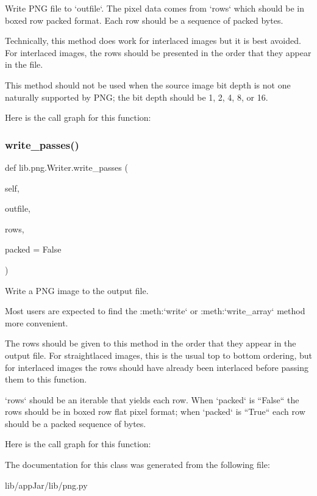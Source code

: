 \begin{DoxyVerb}Write PNG file to `outfile`.  The pixel data comes from `rows`
which should be in boxed row packed format.  Each row should be
a sequence of packed bytes.

Technically, this method does work for interlaced images but it
is best avoided.  For interlaced images, the rows should be
presented in the order that they appear in the file.

This method should not be used when the source image bit depth
is not one naturally supported by PNG; the bit depth should be
1, 2, 4, 8, or 16.
\end{DoxyVerb}
 Here is the call graph for this function\+:
\mbox{\label{classlib_1_1png_1_1_writer_a6826050647c055bb388782a46f5fc08f}} 
\subsubsection{\texorpdfstring{write\+\_\+passes()}{write\_passes()}}
{\footnotesize\ttfamily def lib.\+png.\+Writer.\+write\+\_\+passes (\begin{DoxyParamCaption}\item[{}]{self,  }\item[{}]{outfile,  }\item[{}]{rows,  }\item[{}]{packed = {\ttfamily False} }\end{DoxyParamCaption})}

\begin{DoxyVerb}Write a PNG image to the output file.

Most users are expected to find the :meth:`write` or
:meth:`write_array` method more convenient.

The rows should be given to this method in the order that
they appear in the output file.  For straightlaced images,
this is the usual top to bottom ordering, but for interlaced
images the rows should have already been interlaced before
passing them to this function.

`rows` should be an iterable that yields each row.  When
`packed` is ``False`` the rows should be in boxed row flat pixel
format; when `packed` is ``True`` each row should be a packed
sequence of bytes.
\end{DoxyVerb}
 Here is the call graph for this function\+:


The documentation for this class was generated from the following file\+:\begin{DoxyCompactItemize}
\item 
lib/app\+Jar/lib/png.\+py\end{DoxyCompactItemize}
